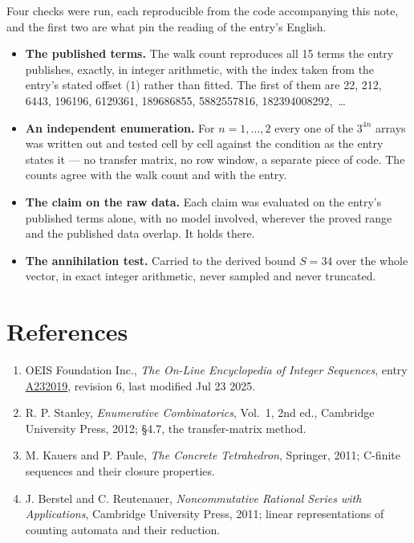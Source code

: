 \documentclass[11pt]{article}
\theoremstyle{definition}
\begin{document}
Four checks were run, each reproducible from the code accompanying this note, and the first two are what pin the reading of the entry's English.

\begin{itemize}

\item {\bfseries The published terms.} The walk count reproduces all 15 terms the entry publishes, exactly, in integer arithmetic, with the index taken from the entry's stated offset (1) rather than fitted. The first of them are 22, 212, 6443, 196196, 6129361, 189686855, 5882557816, 182394008292,~\dots

\item {\bfseries An independent enumeration.} For $n = 1,\dots,2$ every one of the $3^{4n}$ arrays was written out and tested cell by cell against the condition as the entry states it --- no transfer matrix, no row window, a separate piece of code. The counts agree with the walk count and with the entry.

\item {\bfseries The claim on the raw data.} Each claim was evaluated on the entry's published terms alone, with no model involved, wherever the proved range and the published data overlap. It holds there.

\item {\bfseries The annihilation test.} Carried to the derived bound $S = 34$ over the whole vector, in exact integer arithmetic, never sampled and never truncated.

\end{itemize}

\section{References}

\begin{enumerate}

\item OEIS Foundation Inc., \emph{The On-Line Encyclopedia of Integer Sequences}, entry \href{https://oeis.org/A232019}{A232019}, revision 6, last modified Jul 23 2025.

\item R. P. Stanley, \emph{Enumerative Combinatorics}, Vol.~1, 2nd ed., Cambridge University Press, 2012; \S4.7, the transfer-matrix method.

\item M. Kauers and P. Paule, \emph{The Concrete Tetrahedron}, Springer, 2011; C-finite sequences and their closure properties.

\item J. Berstel and C. Reutenauer, \emph{Noncommutative Rational Series with Applications}, Cambridge University Press, 2011; linear representations of counting automata and their reduction.

\end{enumerate}
\end{document}
